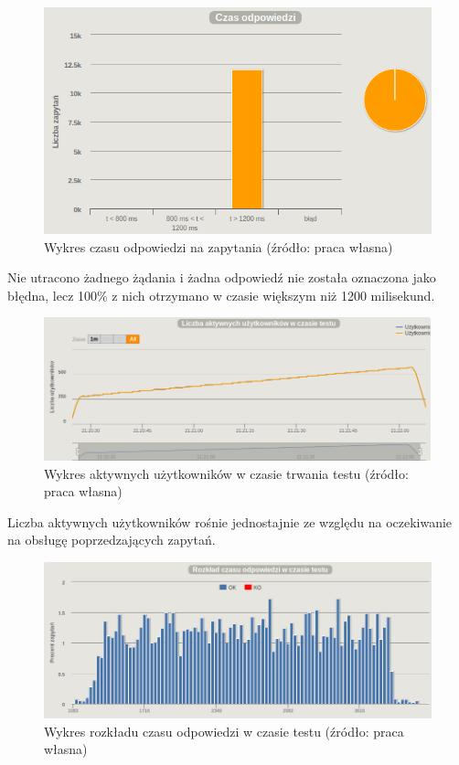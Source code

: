 \documentclass[12pt,twoside]{article}
\begin{document}
\begin{figure}[htbp]
\centering
\includegraphics[resolution=150]{test_results/java/file/screenshots/response_times.png}
\caption{Wykres czasu odpowiedzi na zapytania (źródło: praca własna)}
\end{figure}

Nie utracono żadnego żądania i żadna odpowiedź nie została oznaczona
jako błędna, lecz 100\% z nich otrzymano w czasie większym niż 1200
milisekund.

\begin{figure}[htbp]
\centering
\includegraphics[resolution=150]{test_results/java/file/screenshots/active_users.png}
\caption{Wykres aktywnych użytkowników w czasie trwania testu (źródło: praca własna)}
\end{figure}

Liczba aktywnych użytkowników rośnie jednostajnie ze względu na
oczekiwanie na obsługę poprzedzających zapytań.

\begin{figure}[htbp]
\centering
\includegraphics[resolution=150]{test_results/java/file/screenshots/distribution.png}
\caption{Wykres rozkładu czasu odpowiedzi w czasie testu (źródło: praca własna)}
\end{figure}
\end{document}
